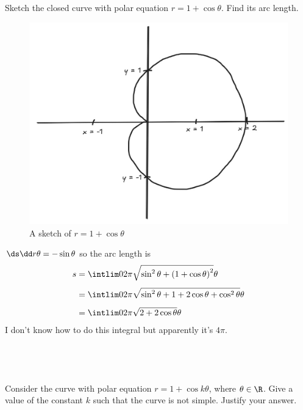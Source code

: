 \documentclass[a4paper]{article}
\begin{document}
\subsection{~} %

\begin{questionbody}
Sketch the closed curve with polar equation $r = 1 + \cos \theta$. Find its arc length.
\end{questionbody}

\begin{figure}[h]
    \centering
    \includegraphics[scale=0.3]{Q1b}
    \caption{A sketch of $r = 1 + \cos\theta$}
\end{figure}

$\ds\dd r\theta = -\sin\theta$ so the arc length is \begin{align*}
s &= \intlim 0{2\pi} {\sqrt{\sin^2 \theta + {(1 + \cos\theta)}^2}} \theta\\[1ex]
&= \intlim 0{2\pi} {\sqrt{\sin^2 \theta + 1 + 2\cos\theta + \cos^2 \theta}} \theta\\[1ex]
&= \intlim 0{2\pi} {\sqrt{2 + 2\cos\theta}} \theta
\end{align*}
I don't know how to do this integral but apparently it's $4\pi$.

\newpage
\subsection{~} %

\begin{questionbody}
Consider the curve with polar equation $r = 1 + \cos k \theta$, where $\theta \in \R$. Give a value of the constant $k$ such that the curve is not simple. Justify your answer.
\end{questionbody}
\end{document}
